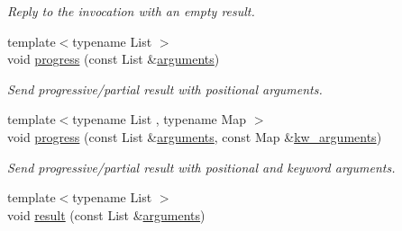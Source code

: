 \begin{DoxyCompactItemize}
\begin{DoxyCompactList}\small\item\em Reply to the invocation with an empty result. \end{DoxyCompactList}\item 
{\footnotesize template$<$typename List $>$ }\\void \hyperlink{classautobahn_1_1wamp__invocation__impl_a7831f98f599c93556be5b49c1b367851}{progress} (const List \&\hyperlink{classautobahn_1_1wamp__invocation__impl_aa310c722287e63499c6d30cc8e308cba}{arguments})\hypertarget{classautobahn_1_1wamp__invocation__impl_a7831f98f599c93556be5b49c1b367851}{}\label{classautobahn_1_1wamp__invocation__impl_a7831f98f599c93556be5b49c1b367851}

\begin{DoxyCompactList}\small\item\em Send progressive/partial result with positional arguments. \end{DoxyCompactList}\item 
{\footnotesize template$<$typename List , typename Map $>$ }\\void \hyperlink{classautobahn_1_1wamp__invocation__impl_aab157a8cf1a60b5df4055bf25597bf8f}{progress} (const List \&\hyperlink{classautobahn_1_1wamp__invocation__impl_aa310c722287e63499c6d30cc8e308cba}{arguments}, const Map \&\hyperlink{classautobahn_1_1wamp__invocation__impl_a29184a2573d07b389bc25bfa3444c112}{kw\+\_\+arguments})\hypertarget{classautobahn_1_1wamp__invocation__impl_aab157a8cf1a60b5df4055bf25597bf8f}{}\label{classautobahn_1_1wamp__invocation__impl_aab157a8cf1a60b5df4055bf25597bf8f}

\begin{DoxyCompactList}\small\item\em Send progressive/partial result with positional and keyword arguments. \end{DoxyCompactList}\item 
{\footnotesize template$<$typename List $>$ }\\void \hyperlink{classautobahn_1_1wamp__invocation__impl_a0640f5fb84f4b3c8318670c26617a993}{result} (const List \&\hyperlink{classautobahn_1_1wamp__invocation__impl_aa310c722287e63499c6d30cc8e308cba}{arguments})\hypertarget{classautobahn_1_1wamp__invocation__impl_a0640f5fb84f4b3c8318670c26617a993}{}\label{classautobahn_1_1wamp__invocation__impl_a0640f5fb84f4b3c8318670c26617a993}


\end{DoxyCompactItemize}
